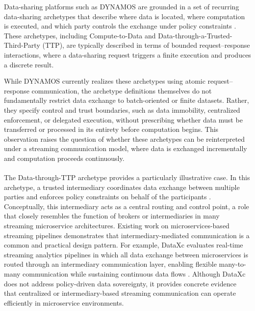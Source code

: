 \documentclass[a4paper,10pt,british]{scrartcl}
\begin{document}
Data-sharing platforms such as DYNAMOS are grounded in a set of recurring data-sharing archetypes that describe where data is located, where computation is executed, and which party controls the exchange under policy constraints \cite{stutterheim2023thesis,stutterheim2023icsa}. These archetypes, including Compute-to-Data and Data-through-a-Trusted-Third-Party (TTP), are typically described in terms of bounded request–response interactions, where a data-sharing request triggers a finite execution and produces a discrete result.

While DYNAMOS currently realizes these archetypes using atomic request–response communication, the archetype definitions themselves do not fundamentally restrict data exchange to batch-oriented or finite datasets. Rather, they specify control and trust boundaries, such as data immobility, centralized enforcement, or delegated execution, without prescribing whether data must be transferred or processed in its entirety before computation begins. This observation raises the question of whether these archetypes can be reinterpreted under a streaming communication model, where data is exchanged incrementally and computation proceeds continuously.

\paragraph{}
The Data-through-TTP archetype provides a particularly illustrative case. In this archetype, a trusted intermediary coordinates data exchange between multiple parties and enforces policy constraints on behalf of the participants \cite{stutterheim2023thesis}. Conceptually, this intermediary acts as a central routing and control point, a role that closely resembles the function of brokers or intermediaries in many streaming microservice architectures. Existing work on microservices-based streaming pipelines demonstrates that intermediary-mediated communication is a common and practical design pattern. For example, DataXc evaluates real-time streaming analytics pipelines in which all data exchange between microservices is routed through an intermediary communication layer, enabling flexible many-to-many communication while sustaining continuous data flows \cite{coviello2022dataxc}. Although DataXc does not address policy-driven data sovereignty, it provides concrete evidence that centralized or intermediary-based streaming communication can operate efficiently in microservice environments.
\end{document}
